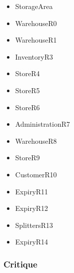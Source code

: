 \begin{itemize}
\item StorageArea

\item WarehouseR0

\item WarehouseR1

\item InventoryR3

\item StoreR4

\item StoreR5

\item StoreR6

\item AdministrationR7

\item WarehouseR8

\item StoreR9

\item CustomerR10

\item ExpiryR11

\item ExpiryR12

\item SplittersR13

\item ExpiryR14

\end{itemize}

\subsubsection{Critique}
\label{critique}

